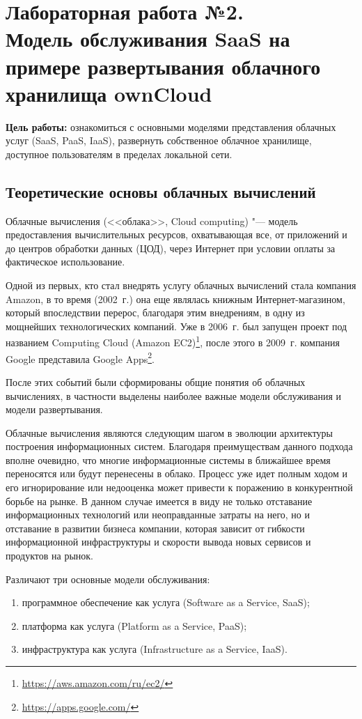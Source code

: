 \section[ЛР №2. Модель обслуживания SaaS, ownCloud]{Лабораторная работа №2. \\
Модель обслуживания SaaS на примере развертывания облачного хранилища ownCloud}

\textbf{Цель работы:} ознакомиться с основными моделями представления облачных услуг (SaaS, PaaS, IaaS), развернуть собственное облачное хранилище, доступное пользователям в пределах локальной сети.

\subsection{Теоретические основы облачных вычислений}

Облачные вычисления (<<облака>>, Cloud computing) "--- модель предоставления вычислительных ресурсов, охватывающая все, от приложений и до центров обработки данных (ЦОД), через Интернет при условии оплаты за фактическое использование.

Одной из первых, кто стал внедрять услугу облачных вычислений стала компания Amazon, в то время (2002~г.) она еще являлась книжным Интернет-магазином, который впоследствии перерос, благодаря этим внедрениям, в одну из мощнейших технологических компаний.
Уже в 2006~г. был запущен проект под названием Computing Cloud (Amazon EC2)\footnote{\url{https://aws.amazon.com/ru/ec2/}}, после этого в 2009~г. компания Google представила Google Apps\footnote{\url{https://apps.google.com/}}.

После этих событий были сформированы общие понятия об облачных вычислениях, в частности выделены наиболее важные модели обслуживания и модели развертывания.

Облачные вычисления являются следующим шагом в эволюции архитектуры построения информационных систем.
Благодаря преимуществам данного подхода вполне очевидно, что многие информационные системы в ближайшее время переносятся или будут перенесены в облако.
Процесс уже идет полным ходом и его игнорирование или недооценка может привести к поражению в конкурентной борьбе на рынке.
В данном случае имеется в виду не только отставание информационных технологий или неоправданные затраты на него, но и отставание в развитии бизнеса компании, которая зависит от гибкости информационной инфраструктуры и скорости вывода новых сервисов и продуктов на рынок.

Различают три основные модели обслуживания:
\begin{enumerate}
    \item программное обеспечение как услуга (Software as a Service, SaaS);
    \item платформа как услуга (Platform as a Service, PaaS);
    \item инфраструктура как услуга (Infrastructure as a Service, IaaS).
\end{enumerate}

